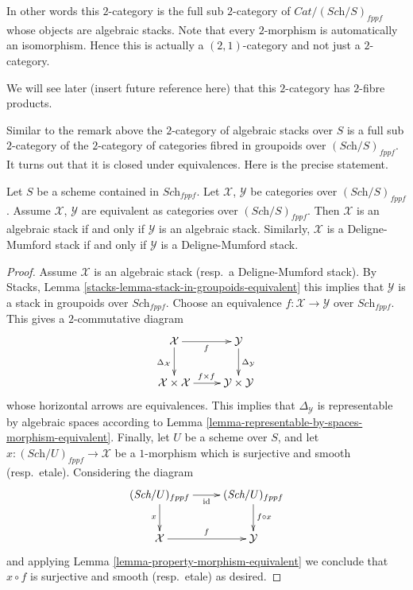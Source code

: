 \noindent
In other words this $2$-category is the full sub $2$-category of
$\textit{Cat}/(\textit{Sch}/S)_{fppf}$ whose objects are algebraic stacks.
Note that every $2$-morphism is automatically an isomorphism.
Hence this is actually a $(2, 1)$-category and not just a $2$-category.

\medskip\noindent
We will see later (insert future reference here) that this $2$-category
has $2$-fibre products.

\medskip\noindent
Similar to the remark above the $2$-category of algebraic stacks over $S$ is a
full sub $2$-category of the $2$-category of categories fibred in groupoids
over $(\textit{Sch}/S)_{fppf}$. It turns out that it is closed under
equivalences. Here is the precise statement.

\begin{lemma}
\label{lemma-equivalent}
Let $S$ be a scheme contained in $\textit{Sch}_{fppf}$.
Let $\mathcal{X}$, $\mathcal{Y}$ be categories over $(\textit{Sch}/S)_{fppf}$.
Assume $\mathcal{X}$, $\mathcal{Y}$ are equivalent as categories over
$(\textit{Sch}/S)_{fppf}$. Then $\mathcal{X}$ is an algebraic stack if and
only if $\mathcal{Y}$ is an algebraic stack. Similarly, $\mathcal{X}$
is a Deligne-Mumford stack if and only if $\mathcal{Y}$ is a Deligne-Mumford
stack.
\end{lemma}

\begin{proof}
Assume $\mathcal{X}$ is an algebraic stack (resp.\ a Deligne-Mumford stack). By
Stacks, Lemma \ref{stacks-lemma-stack-in-groupoids-equivalent}
this implies that $\mathcal{Y}$ is a stack in groupoids over
$\textit{Sch}_{fppf}$. Choose an equivalence $f : \mathcal{X} \to \mathcal{Y}$
over $\textit{Sch}_{fppf}$. This gives a $2$-commutative diagram
$$
\xymatrix{
\mathcal{X} \ar[r]_f \ar[d]_{\Delta_\mathcal{X}} &
\mathcal{Y} \ar[d]^{\Delta_\mathcal{Y}} \\
\mathcal{X} \times \mathcal{X} \ar[r]^{f \times f} &
\mathcal{Y} \times \mathcal{Y}
}
$$
whose horizontal arrows are equivalences. This implies that
$\Delta_\mathcal{Y}$ is representable by algebraic spaces according to
Lemma \ref{lemma-representable-by-spaces-morphism-equivalent}.
Finally, let $U$ be a scheme over $S$, and let
$x : (\textit{Sch}/U)_{fppf} \to \mathcal{X}$ be a $1$-morphism which
is surjective and smooth (resp.\ etale). Considering the diagram
$$
\xymatrix{
(\textit{Sch}/U)_{fppf} \ar[r]_{\text{id}} \ar[d]_{x} &
(\textit{Sch}/U)_{fppf} \ar[d]^{f \circ x} \\
\mathcal{X} \ar[r]^f &
\mathcal{Y}
}
$$
and applying
Lemma \ref{lemma-property-morphism-equivalent}
we conclude that $x \circ f$ is surjective and smooth (resp.\ etale)
as desired.
\end{proof}




